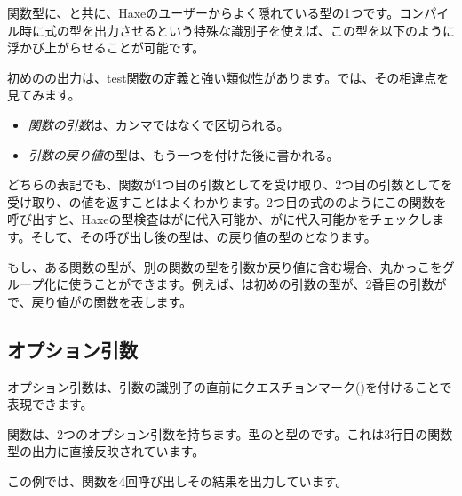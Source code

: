 
関数型に、と共に、Haxeのユーザーからよく隠れている型の1つです。コンパイル時に式の型を出力させるという特殊な識別子を使えば、この型を以下のように浮かび上がらせることが可能です。


初めのの出力は、test関数の定義と強い類似性があります。では、その相違点を見てみます。

\begin{itemize}
	\item \emph{関数の引数}は、カンマではなく\expr{->}で区切られる。
	\item \emph{引数の戻り値}の型は、もう一つ\expr{->}を付けた後に書かれる。
\end{itemize}

どちらの表記でも、関数が1つ目の引数としてを受け取り、2つ目の引数としてを受け取り、の値を返すことはよくわかります。2つ目の式ののようにこの関数を呼び出すと、Haxeの型検査はがに代入可能か、がに代入可能かをチェックします。そして、その呼び出し後の型は、の戻り値の型のとなります。

もし、ある関数の型が、別の関数の型を引数か戻り値に含む場合、丸かっこをグループ化に使うことができます。例えば、は初めの引数の型が、2番目の引数がで、戻り値がの関数を表します。

\subsection{オプション引数}
\label{types-function-optional-arguments}

オプション引数は、引数の識別子の直前にクエスチョンマーク()を付けることで表現できます。


関数は、2つのオプション引数を持ちます。型のと型のです。これは3行目の関数型の出力に直接反映されています。

この例では、関数を4回呼び出しその結果を出力しています。

